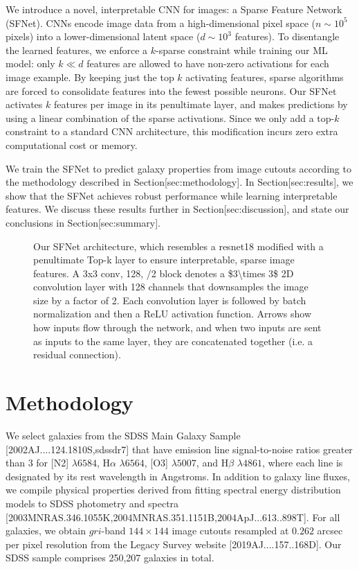 \documentclass[11pt,a4paper]{article}
\begin{document}
We introduce a novel, interpretable CNN for images: a Sparse Feature Network (SFNet). CNNs encode image data from a high-dimensional pixel space ($n \sim 10^5$ pixels) into a lower-dimensional latent space ($d \sim 10^3$ features). To disentangle the learned features, we enforce a $k$-sparse constraint while training our ML model: only $k \ll d$ features are allowed to have non-zero activations for each image example. By keeping just the top $k$ activating features, sparse algorithms are forced to consolidate features into the fewest possible neurons. Our SFNet activates $k$ features per image in its penultimate layer, and makes predictions by using a linear combination of the sparse activations. Since we only add a top-$k$ constraint to a standard CNN architecture, this modification incurs zero extra computational cost or memory.

We train the SFNet to predict galaxy properties from image cutouts according to the methodology described in Section[sec:methodology]. In Section[sec:results], we show that the SFNet achieves robust performance while learning interpretable features. We discuss these results further in Section[sec:discussion], and state our conclusions in Section[sec:summary].

\begin{figure}[h]
\caption{Our SFNet architecture, which resembles a resnet18 modified with a penultimate Top-k layer to ensure interpretable, sparse image features. A 3x3 conv, 128, /2 block denotes a \$3\textbackslash{}times 3\$ 2D convolution layer with 128 channels that downsamples the image size by a factor of 2. Each convolution layer is followed by batch normalization and then a ReLU activation function. Arrows show how inputs flow through the network, and when two inputs are sent as inputs to the same layer, they are concatenated together (i.e. a residual connection).}
\end{figure}

\section{Methodology}

We select galaxies from the SDSS Main Galaxy Sample [2002AJ....124.1810S,sdssdr7] that have emission line signal-to-noise ratios greater than 3 for [N2] $\lambda6584$, H$\alpha$ $\lambda6564$, [O3] $\lambda5007$, and H$\beta$ $\lambda4861$, where each line is designated by its rest wavelength in Angstroms. In addition to galaxy line fluxes, we compile physical properties derived from fitting spectral energy distribution models to SDSS photometry and spectra [2003MNRAS.346.1055K,2004MNRAS.351.1151B,2004ApJ...613..898T]. For all galaxies, we obtain $gri$-band $144\times 144$ image cutouts resampled at $0.262$ arcsec per pixel resolution from the Legacy Survey website [2019AJ....157..168D]. Our SDSS sample comprises 250,207 galaxies in total.
\end{document}
